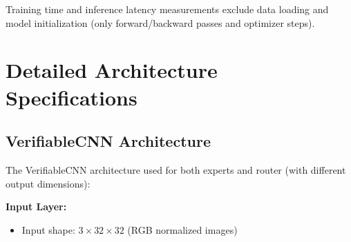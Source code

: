\documentclass[11pt,a4paper]{article}
\begin{document}
Training time and inference latency measurements exclude data loading and model initialization (only forward/backward passes and optimizer steps).

\section{Detailed Architecture Specifications}

\subsection{VerifiableCNN Architecture}

The VerifiableCNN architecture used for both experts and router (with different output dimensions):

\textbf{Input Layer:}
\begin{itemize}
    \item Input shape: $3 \times 32 \times 32$ (RGB normalized images)
\end{itemize}
\end{document}
